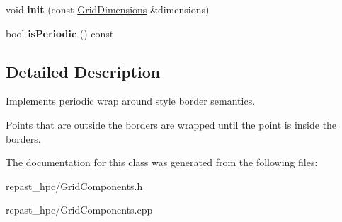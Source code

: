 \begin{DoxyCompactItemize}
\item 
\hypertarget{classrepast_1_1_wrap_around_borders_a68748d5a4e148ee99ebc29e5e0009808}{void {\bfseries init} (const \hyperlink{classrepast_1_1_grid_dimensions}{Grid\-Dimensions} \&dimensions)}\label{classrepast_1_1_wrap_around_borders_a68748d5a4e148ee99ebc29e5e0009808}

\item 
\hypertarget{classrepast_1_1_wrap_around_borders_a69ffcf2cca2df6aac4f751739858345d}{bool {\bfseries is\-Periodic} () const }\label{classrepast_1_1_wrap_around_borders_a69ffcf2cca2df6aac4f751739858345d}

\end{DoxyCompactItemize}


\subsection{Detailed Description}
Implements periodic wrap around style border semantics. 

Points that are outside the borders are wrapped until the point is inside the borders. 

The documentation for this class was generated from the following files\-:\begin{DoxyCompactItemize}
\item 
repast\-\_\-hpc/Grid\-Components.\-h\item 
repast\-\_\-hpc/Grid\-Components.\-cpp\end{DoxyCompactItemize}
